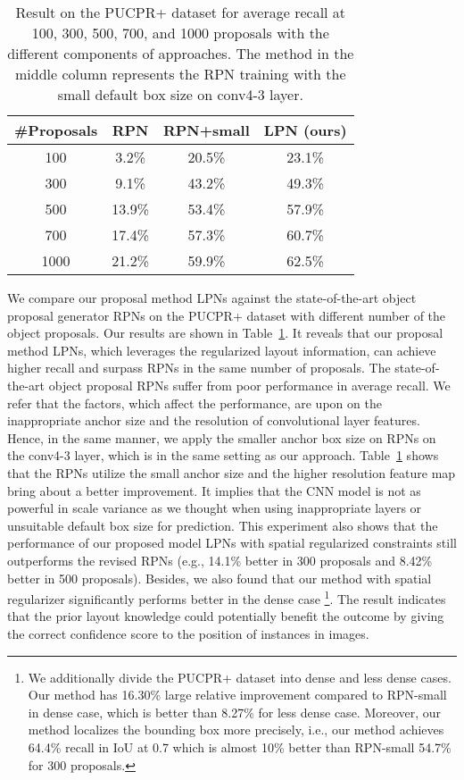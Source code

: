 \documentclass[10pt,twocolumn,letterpaper]{article}
\begin{document}
\begin{table}[h]
	\caption{Result on the PUCPR+ \cite{01_de2015pklot} dataset for average recall at 100, 300, 500, 700, and 1000 proposals with the different components of approaches. The method in the middle column represents the RPN training with the small default box size on conv4-3 layer.}
\begin{center}
\begin{tabular}{|c|c|c|c|}
\hline
\#Proposals & RPN \cite{21_ren2015faster} & RPN+small & LPN (ours) \\
\hline\hline
100  & 3.2\% & 20.5\% & 23.1\% \\
\hline
300  & 9.1\% & 43.2\% & 49.3\% \\
\hline
500  & 13.9\% & 53.4\% & 57.9\% \\
\hline
700  & 17.4\% & 57.3\% & 60.7\% \\
\hline
1000 & 21.2\% & 59.9\% & 62.5\% \\
\hline
\end{tabular}
\end{center}
\label{table:t2}
\end{table}
\vspace{-0.5 cm}

We compare our proposal method LPNs against the state-of-the-art object proposal generator RPNs \cite{21_ren2015faster} on the PUCPR+ dataset with different number of the object proposals. Our results are shown in Table~\ref{table:t2}. It reveals that our proposal method LPNs, which leverages the regularized layout information, can achieve higher recall and surpass RPNs in the same number of proposals. The state-of-the-art object proposal RPNs suffer from poor performance in average recall. We refer that the factors, which affect the performance, are upon on the inappropriate anchor size and the resolution of convolutional layer features. Hence, in the same manner, we apply the smaller anchor box size on RPNs on the conv4-3 layer, which is in the same setting as our approach. Table~\ref{table:t2} shows that the RPNs utilize the small anchor size and the higher resolution feature map bring about a better improvement. It implies that the CNN model is not as powerful in scale variance as we thought when using inappropriate layers or unsuitable default box size for prediction.
%
This experiment also shows that the performance of our proposed model LPNs with spatial regularized constraints still outperforms the revised RPNs (e.g., 14.1\% better in 300 proposals and 8.42\% better in 500 proposals).
%
Besides, we also found that our method with spatial regularizer significantly performs better in the dense case \footnote{We additionally divide the PUCPR+ dataset into dense and less dense cases. Our method has 16.30\% large relative improvement compared to RPN-small in dense case, which is better than 8.27\% for less dense case. Moreover, our method localizes the bounding box more precisely, i.e., our method achieves 64.4\% recall in IoU at 0.7 which is almost 10\% better than RPN-small 54.7\% for 300 proposals.}. The result indicates that the prior layout knowledge could potentially benefit the outcome by giving the correct confidence score to the position of instances in images.
\end{document}
